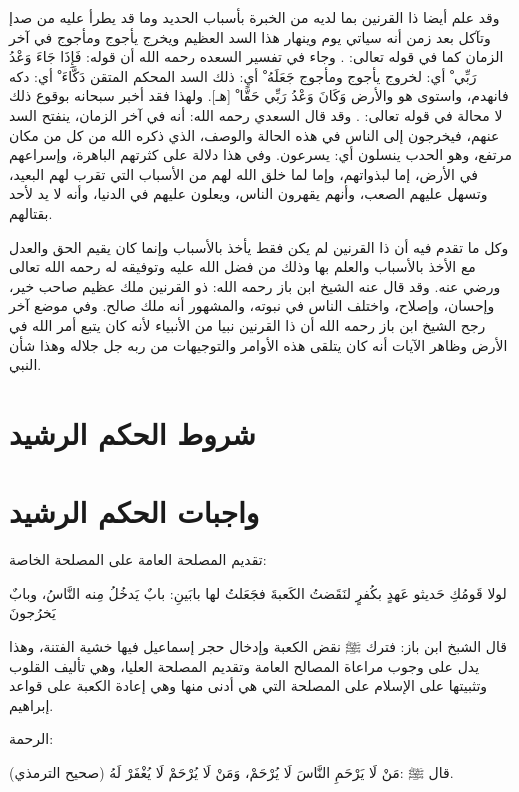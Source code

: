 وقد علم أيضا ذا القرنين بما لديه من الخبرة بأسباب الحديد وما قد يطرأ عليه من صدإ وتآكل بعد زمن أنه سياتي يوم وينهار هذا السد العظيم ويخرج يأجوج ومأجوج في آخر الزمان كما في قوله تعالى: 
\quranayah*[18][98][6]{\footnotesize \surahname*[18]}. وجاء في تفسير السعده رحمه الله أن قوله: { فَإِذَا جَاءَ وَعْدُ رَبِّي ْ} أي: لخروج يأجوج ومأجوج { جَعَلَهُ ْ} أي: ذلك السد المحكم المتقن { دَكَّاءَ ْ} أي: دكه فانهدم، واستوى هو والأرض { وَكَانَ وَعْدُ رَبِّي حَقًّا ْ} [هـ]. ولهذا فقد أخبر سبحانه بوقوع ذلك لا محالة في قوله تعالى: 
\quranayah*[21][96]{\footnotesize \surahname*[21]}. وقد قال السعدي رحمه الله: أنه في آخر الزمان، ينفتح السد عنهم، فيخرجون إلى الناس في هذه الحالة والوصف، الذي ذكره الله من كل من مكان مرتفع، وهو الحدب ينسلون أي: يسرعون. وفي هذا دلالة على كثرتهم الباهرة، وإسراعهم في الأرض، إما لبذواتهم، وإما لما خلق الله لهم من الأسباب التي تقرب لهم البعيد، وتسهل عليهم الصعب، وأنهم يقهرون الناس، ويعلون عليهم في الدنيا، وأنه لا يد لأحد بقتالهم. 

وكل ما تقدم فيه أن ذا القرنين لم يكن فقط يأخذ بالأسباب وإنما كان يقيم الحق والعدل مع الأخذ بالأسباب والعلم بها وذلك من فضل الله عليه وتوفيقه له رحمه الله تعالى ورضي عنه. وقد قال عنه الشيخ ابن باز رحمه الله: ذو القرنين ملك عظيم صاحب خير، وإحسان، وإصلاح، واختلف الناس في نبوته، والمشهور أنه ملك صالح. وفي موضع آخر رجح الشيخ ابن باز رحمه الله أن ذا القرنين نبيا من الأنبياء لأنه كان يتبع أمر الله في الأرض وظاهر الآيات أنه كان يتلقى هذه الأوامر والتوجيهات من ربه جل جلاله وهذا شأن النبي.

\section{شروط الحكم الرشيد}



\section{واجبات الحكم الرشيد}


تقديم المصلحة العامة على المصلحة الخاصة:

لولا قَومُكِ حَديثو عَهدٍ بكُفرٍ لنَقَضتُ الكَعبةَ فجَعَلتُ لها بابَينِ: بابٌ يَدخُلُ مِنه النَّاسُ، وبابٌ يَخرُجونَ

قال الشبخ ابن باز: فترك ﷺ نقض الكعبة وإدخال حجر إسماعيل فيها خشية الفتنة، وهذا يدل على وجوب مراعاة المصالح العامة وتقديم المصلحة العليا، وهي تأليف القلوب وتثبيتها على الإسلام على المصلحة التي هي أدنى منها وهي إعادة الكعبة على قواعد إبراهيم.

الرحمة:

قال ﷺ :مَنْ لَا يَرْحَمِ النَّاسَ لَا يُرْحَمْ، وَمَنْ لَا يُرْحَمْ لَا يُغْفَرْ لَهُ {\footnotesize (صحيح الترمذي)}.


